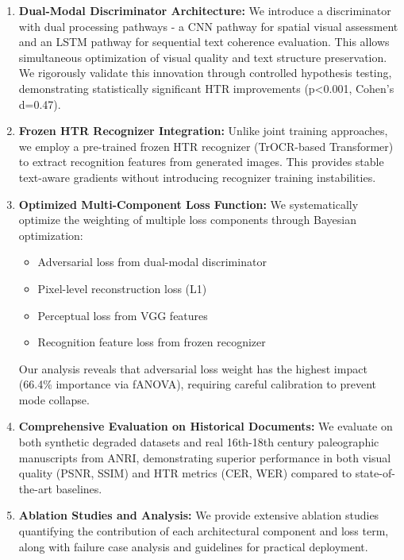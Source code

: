 \documentclass[journal]{IEEEtran}
\begin{document}
\begin{enumerate}
    \item \textbf{Dual-Modal Discriminator Architecture:} We introduce a discriminator with dual processing pathways - a CNN pathway for spatial visual assessment and an LSTM pathway for sequential text coherence evaluation. This allows simultaneous optimization of visual quality and text structure preservation. We rigorously validate this innovation through controlled hypothesis testing, demonstrating statistically significant HTR improvements (p<0.001, Cohen's d=0.47).
    
    \item \textbf{Frozen HTR Recognizer Integration:} Unlike joint training approaches, we employ a pre-trained frozen HTR recognizer (TrOCR-based Transformer) to extract recognition features from generated images. This provides stable text-aware gradients without introducing recognizer training instabilities.
    
    \item \textbf{Optimized Multi-Component Loss Function:} We systematically optimize the weighting of multiple loss components through Bayesian optimization:
    \begin{itemize}
        \item Adversarial loss from dual-modal discriminator
        \item Pixel-level reconstruction loss (L1)
        \item Perceptual loss from VGG features
        \item Recognition feature loss from frozen recognizer
    \end{itemize}
    Our analysis reveals that adversarial loss weight has the highest impact (66.4\% importance via fANOVA), requiring careful calibration to prevent mode collapse.
    
    \item \textbf{Comprehensive Evaluation on Historical Documents:} We evaluate on both synthetic degraded datasets and real 16th-18th century paleographic manuscripts from ANRI, demonstrating superior performance in both visual quality (PSNR, SSIM) and HTR metrics (CER, WER) compared to state-of-the-art baselines.
    
    \item \textbf{Ablation Studies and Analysis:} We provide extensive ablation studies quantifying the contribution of each architectural component and loss term, along with failure case analysis and guidelines for practical deployment.
\end{enumerate}
\end{document}
